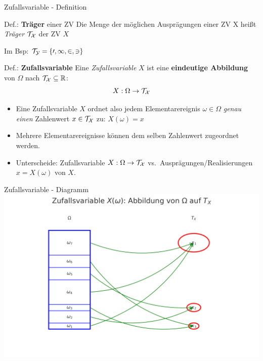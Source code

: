 \documentclass[
  10pt,
  ignorenonframetext,
]{beamer}
\providecommand{\tightlist}{%
  \setlength{\itemsep}{0pt}\setlength{\parskip}{0pt}}
\begin{document}
\begin{frame}{Zufallsvariable - Definition}
\label{zufallsvariable---definition}
\begin{block}{Def.: \textbf{Träger} einer ZV}
\label{def.-truxe4ger-einer-zv}
Die Menge der möglichen Ausprägungen einer ZV X heißt \emph{Träger}
\(\cal{T}_X\) der ZV \(X\)
\end{block}

Im Bsp: \(\cal{T}_Y = \{0,1,2,3\}\)\\

\begin{block}{Def.: \textbf{Zufallsvariable}}
\label{def.-zufallsvariable}
Eine \emph{Zufallsvariable} \(X\) ist eine \textbf{eindeutige Abbildung}
von \(\Omega\) nach \(\cal{T}_X \subseteq \mathbb{R}\):
\[X: \Omega \rightarrow \cal{T}_X\]
\end{block}

\begin{itemize}
\tightlist
\item
  Eine Zufallsvariable \(X\) ordnet also jedem Elementarereignis
  \(\omega \in \Omega\) \emph{genau einen} Zahlenwert
  \(x \in \cal{T}_X\) zu: \(X(\omega) = x\)
\item
  Mehrere Elementarereignisse können dem selben Zahlenwert zugeordnet
  werden.
\item
  Unterscheide: Zufallsvariable \(X:\Omega \to \cal{T}_X\)
  vs.~Ausprägungen/Realisierungen \(x = X(\omega)\) von \(X\).
\end{itemize}

\end{frame}

\begin{frame}{Zufallsvariable - Diagramm}
\label{zufallsvariable---diagramm}
\includegraphics[height = 0.8\textheight]{pics/zv-diagramm.png}
\end{frame}
\end{document}
